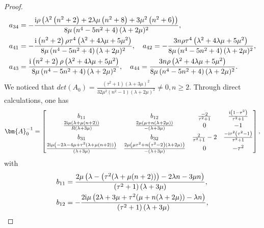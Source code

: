 \documentclass[11pt,reqno,twoside]{amsart}
\theoremstyle{definition}
\theoremstyle{remark}
\numberwithin{equation}{section}
\begin{document}
\begin{proof}
\begin{align}
		a_{34}&=-\frac{\mathrm{i} \rho   \left(\lambda ^2 \left(n^2+2\right)+2 \lambda  \mu  \left(n^2+8\right)+3 \mu ^2 \left(n^2+6\right)\right)}{8 \mu  \left(n^4-5 n^2+4\right) (\lambda +2 \mu )^2},\notag\\
		a_{41}&=-\frac{\mathrm{i} \left(n^2+2\right) \rho  \tau ^4 \left(\lambda ^2+4 \lambda  \mu +5 \mu ^2\right)}{8 \mu  \left(n^4-5 n^2+4\right) (\lambda +2 \mu )^2},\quad a_{42}=-\frac{3 n \rho   \tau ^4 \left(\lambda ^2+4 \lambda  \mu +5 \mu ^2\right)}{8 \mu  \left(n^4-5 n^2+4\right) (\lambda +2 \mu )^2},\notag\\
		a_{43}&=\frac{\mathrm{i} \left(n^2+2\right) \rho   \left(\lambda ^2+4 \lambda  \mu +5 \mu ^2\right)}{8 \mu  \left(n^4-5 n^2+4\right) (\lambda +2 \mu )^2},\quad a_{44}=\frac{3 n \rho   \left(\lambda ^2+4 \lambda  \mu +5 \mu ^2\right)}{8 \mu  \left(n^4-5 n^2+4\right) (\lambda +2 \mu )^2}.\notag
	\end{align}
	\fi  
	We noticed that 
	$det\left ( A_{0}  \right ) =\frac{ \left(\tau ^2+1\right) (\lambda +3 \mu )^2}{32 \mu ^2 \left(n^2-1\right) (\lambda +2 \mu )^2}\ne0, n\ge 2 $. Through direct calculations, one has 
	\begin{align}\notag
		\bm{A}_{0}^{-1} =\begin{bmatrix}
			b_{11} & b_{12} & \frac{-2}{\tau ^2+1} & \frac{\mathrm{i} \left(1-\tau ^2\right)}{\tau ^2+1} \\
			\frac{2 \mathrm{i} \mu  (\lambda +\mu  (n+2))}{R (\lambda +3 \mu )} & \frac{2 \mu  (\mu +n (\lambda +2 \mu ))}{- (\lambda +3 \mu )} & 0 & -1 \\
			b_{31} & b_{32} & \frac{2}{\tau ^2+1}-2 & \frac{-\mathrm{i} \tau ^2 \left(\tau ^2-1\right)}{\tau ^2+1} \\
			\frac{2 \mathrm{i} \mu  \left(-2 \lambda -4 \mu +\tau ^2 (\lambda +\mu  (n+2))\right)}{ (\lambda +3 \mu )} & \frac{2 \mu  \left(\mu  \tau ^2+n \left(\tau ^2-2\right) (\lambda +2 \mu )\right)}{-(\lambda +3 \mu )} & 0 & -\tau ^2 \\
		\end{bmatrix},
	\end{align}
	with
	\begin{align}
		b_{11}&=\frac{2 \mu  \left(\lambda -\left(\tau ^2 (\lambda +\mu  (n+2))\right)-2 \lambda  n-3 \mu  n\right)}{ \left(\tau ^2+1\right) (\lambda +3 \mu )},\notag\\
		b_{12}&=-\frac{2 \mathrm{i} \mu  \left(2 \lambda +3 \mu +\tau ^2 (\mu +n (\lambda +2 \mu ))-\lambda  n\right)}{ \left(\tau ^2+1\right) (\lambda +3 \mu )},\notag\\

\end{align}
\end{proof}
\end{document}
